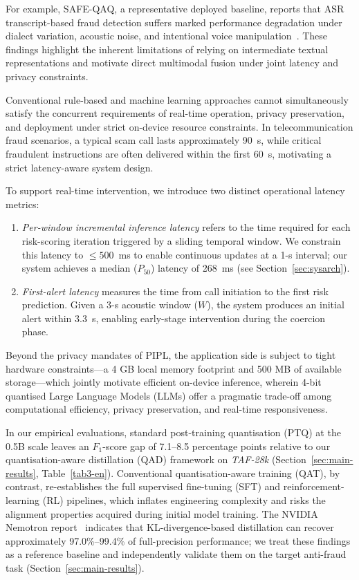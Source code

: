 \documentclass[a4paper,fleqn]{cas-sc}
\begin{document}
For example, SAFE-QAQ, a representative deployed baseline, reports that ASR transcript-based fraud detection suffers marked performance degradation under dialect variation, acoustic noise, and intentional voice manipulation~\citep{2}. These findings highlight the inherent limitations of relying on intermediate textual representations and motivate direct multimodal fusion under joint latency and privacy constraints.

Conventional rule-based and machine learning approaches cannot simultaneously satisfy the concurrent requirements of real-time operation, privacy preservation, and deployment under strict on-device resource constraints. In telecommunication fraud scenarios, a typical scam call lasts approximately 90~s, while critical fraudulent instructions are often delivered within the first 60~s, motivating a strict latency-aware system design.

To support real-time intervention, we introduce two distinct operational latency metrics:
\begin{enumerate}
    \item \textit{Per-window incremental inference latency} refers to the time required for each risk-scoring iteration triggered by a sliding temporal window. We constrain this latency to $\le 500$~ms to enable continuous updates at a 1-s interval; our system achieves a median ($P_{50}$) latency of 268~ms (see Section~\ref{sec:sysarch}).
    \item \textit{First-alert latency} measures the time from call initiation to the first risk prediction. Given a 3-s acoustic window ($W$), the system produces an initial alert within 3.3~s, enabling early-stage intervention during the coercion phase.
\end{enumerate}

Beyond the privacy mandates of PIPL, the application side is subject to tight hardware constraints---a 4 GB local memory footprint and 500 MB of available storage---which jointly motivate efficient on-device inference, wherein 4-bit quantised Large Language Models (LLMs) offer a pragmatic trade-off among computational efficiency, privacy preservation, and real-time responsiveness.



In our empirical evaluations, standard post-training quantisation (PTQ) at the 0.5B scale leaves an $F_1$-score gap of 7.1--8.5 percentage points relative to our quantisation-aware distillation (QAD) framework on \textit{TAF-28k} (Section~\ref{sec:main-results}, Table~\ref{tab3-en}). Conventional quantisation-aware training (QAT), by contrast, re-establishes the full supervised fine-tuning (SFT) and reinforcement-learning (RL) pipelines, which inflates engineering complexity and risks the alignment properties acquired during initial model training. The NVIDIA Nemotron report~\citep{3} indicates that KL-divergence-based distillation can recover approximately 97.0\%--99.4\% of full-precision performance; we treat these findings as a reference baseline and independently validate them on the target anti-fraud task (Section~\ref{sec:main-results}).
\end{document}
